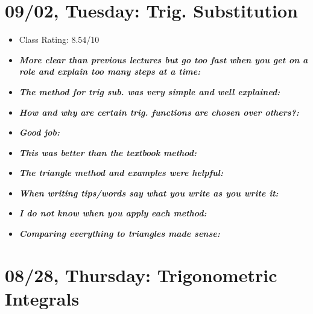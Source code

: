 \documentclass[11pt,letterpaper]{article}
\begin{document}
\newpage
\section*{09/02, Tuesday: Trig. Substitution\label{09-02}}

\begin{itemize}
\item Class Rating: 8.54/10
\item {\bfseries\itshape More clear than previous lectures but go too fast when you get on a role and explain too many steps at a time:}
\item {\bfseries\itshape The method for trig sub. was very simple and well explained:}
\item {\bfseries\itshape How and why are certain trig. functions are chosen over others?:}
\item {\bfseries\itshape Good job:}
\item {\bfseries\itshape This was better than the textbook method:}
\item {\bfseries\itshape The triangle method and examples were helpful:}
\item {\bfseries\itshape When writing tips/words say what you write as you write it:} 
\item {\bfseries\itshape I do not know when you apply each method:} 
\item {\bfseries\itshape Comparing everything to triangles made sense:} 
\end{itemize}

\newpage
\section*{08/28, Thursday: Trigonometric Integrals\label{08-28}}
\end{document}
